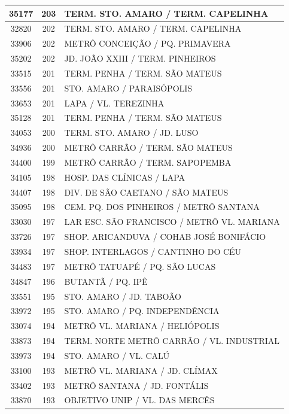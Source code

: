\documentclass[
	12pt,				%
	oneside,			%
	a4paper,			%
	english,			%
	brazil				%
	]{abntex2ppgsi}
\begin{document}
{{\begin{apendicesenv}
\begin{longtable}{c|c|p{7cm}}
 \hline 
35177 &	203 &	TERM. STO. AMARO / TERM. CAPELINHA \\ 
 \hline 
32820 &	202 &	TERM. STO. AMARO / TERM. CAPELINHA \\ 
 \hline 
33906 &	202 &	METRÔ CONCEIÇÃO / PQ. PRIMAVERA \\ 
 \hline 
35202 &	202 &	JD. JOÃO XXIII / TERM. PINHEIROS \\ 
 \hline 
33515 &	201 &	TERM. PENHA / TERM. SÃO MATEUS \\ 
 \hline 
33556 &	201 &	STO. AMARO / PARAISÓPOLIS \\ 
 \hline 
33653 &	201 &	LAPA / VL. TEREZINHA \\ 
 \hline 
35128 &	201 &	TERM. PENHA / TERM. SÃO MATEUS \\ 
 \hline 
34053 &	200 &	TERM. STO. AMARO / JD. LUSO \\ 
 \hline 
34936 &	200 &	METRÔ CARRÃO / TERM. SÃO MATEUS \\ 
 \hline 
34400 &	199 &	METRÔ CARRÃO / TERM. SAPOPEMBA \\ 
 \hline 
34105 &	198 &	HOSP. DAS CLÍNICAS / LAPA \\ 
 \hline 
34407 &	198 &	DIV. DE SÃO CAETANO / SÃO MATEUS \\ 
 \hline 
35095 &	198 &	CEM. PQ. DOS PINHEIROS / METRÔ SANTANA \\ 
 \hline 
33030 &	197 &	LAR ESC. SÃO FRANCISCO / METRÔ VL. MARIANA \\ 
 \hline 
33726 &	197 &	SHOP. ARICANDUVA / COHAB JOSÉ BONIFÁCIO \\ 
 \hline 
33934 &	197 &	SHOP. INTERLAGOS / CANTINHO DO CÉU \\ 
 \hline 
34483 &	197 &	METRÔ TATUAPÉ / PQ. SÃO LUCAS \\ 
 \hline 
34847 &	196 &	BUTANTÃ / PQ. IPÊ \\ 
 \hline 
33551 &	195 &	STO. AMARO / JD. TABOÃO \\ 
 \hline 
33972 &	195 &	STO. AMARO / PQ. INDEPENDÊNCIA \\ 
 \hline 
33074 &	194 &	METRÔ VL. MARIANA / HELIÓPOLIS \\ 
 \hline 
33873 &	194 &	TERM. NORTE METRÔ CARRÃO / VL. INDUSTRIAL \\ 
 \hline 
33973 &	194 &	STO. AMARO / VL. CALÚ \\ 
 \hline 
33100 &	193 &	METRÔ VL. MARIANA / JD. CLÍMAX \\ 
 \hline 
33402 &	193 &	METRÔ SANTANA / JD. FONTÁLIS \\ 
 \hline 
33870 &	193 &	OBJETIVO UNIP / VL. DAS MERCÊS \\ 

\end{longtable}
\end{apendicesenv}}}
\end{document}

